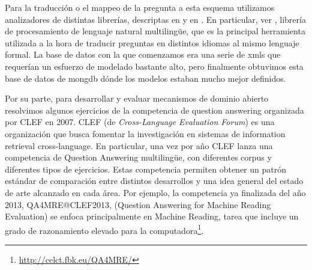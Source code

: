 Para la traducción o el mappeo de la pregunta a esta esquema utilizamos analizadores de distintas librerías, descriptas en  y en . En particular, ver , librería de procesamiento de lenguaje natural multilingüe, que es la principal herramienta utilizada a la hora de traducir preguntas en distintos idiomas al mismo lenguaje formal. La base de datos con la que comenzamos era una serie de xmls que requerían un esfuerzo de modelado bastante alto, pero finalmente obtuvimos esta base de datos de mongdb dónde los modelos estaban mucho mejor definidos.


Por su parte, para desarrollar y evaluar mecanismos de dominio abierto resolvimos algunos ejercicios de la competencia de question answering organizada por CLEF 
en 2007. CLEF (de \textit{Cross-Language Evaluation Forum}) es una organización que busca fomentar la investigación en sistemas de information retrieval cross-language. En particular, una vez por año CLEF lanza una competencia de Question Answering multilingüe, con diferentes corpus y diferentes tipos de ejercicios. Estas competencia permiten obtener un patrón estándar de comparación entre distintos desarrollos y una idea general del estado de arte alcanzado en cada área.
Por ejemplo, la competencia ya finalizada del año 2013, QA4MRE@CLEF2013, (Question Answering for Machine Reading Evaluation) se enfoca principalmente en Machine Reading, tarea que incluye un grado de razonamiento elevado para la computadora\footnote{\url{http://celct.fbk.eu/QA4MRE/}}.

